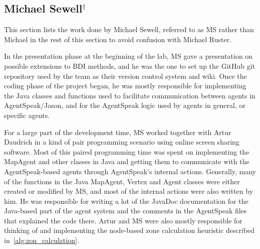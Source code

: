\subsection[Michael Sewell]{Michael Sewell$^{\dagger}$}
This section lists the work done by Michael Sewell, referred to as MS rather than Michael in the rest of this section to avoid confusion with Michael Ruster.

In the presentation phase at the beginning of the lab, MS gave a presentation on possible extensions to BDI methods, and he was the one to set up the GitHub git repository used by the team as their version control system and wiki.
Once the coding phase of the project began, he was mostly responsible for implementing the Java classes and functions used to facilitate communication between agents in AgentSpeak/Jason, and for the AgentSpeak logic used by agents in general, or specific agents.

For a large part of the development time, MS worked together with Artur Daudrich in a kind of pair programming scenario using online screen sharing software.
Most of this paired programming time was spent on implementing the MapAgent and other classes in Java and getting them to communicate with the AgentSpeak-based agents through AgentSpeak's internal actions.
Generally, many of the functions in the Java MapAgent, Vertex and Agent classes were either created or modified by MS, and most of the internal actions were also written by him.
He was responsible for writing a lot of the JavaDoc documentation for the Java-based part of the agent system and the comments in the AgentSpeak files that explained the code there.
Artur and MS were also mostly responsible for thinking of and implementing the node-based zone calculation heuristic described in~\autoref{alg:zon_calculation}.

